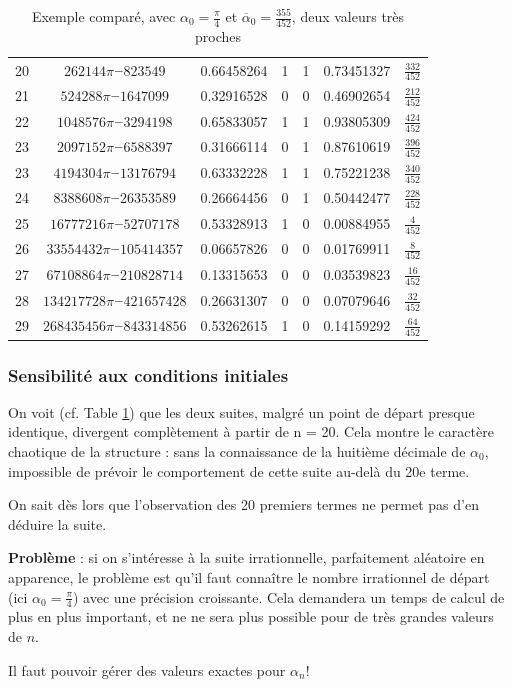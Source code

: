 \documentclass{scrartcl}
\begin{document}
\begin{table}
\begin{tabular}{|*{7}{c|}}
20 & $262144\pi‒823549$ & 0.66458264 & 1 & 1 & 0.73451327 & $\frac{332}{452}$ \\
21 & $524288\pi‒1647099$ & 0.32916528 & 0 & 0 & 0.46902654 & $\frac{212}{452}$ \\
22 & $1048576\pi‒3294198$ & 0.65833057 & 1 & 1 & 0.93805309 & $\frac{424}{452}$ \\
23 & $2097152\pi‒6588397$ & 0.31666114 & 0 & 1 & 0.87610619 & $\frac{396}{452}$ \\
23 & $4194304\pi‒13176794$ & 0.63332228 & 1 & 1 & 0.75221238 & $\frac{340}{452}$ \\
24 & $8388608\pi‒26353589$ & 0.26664456 & 0 & 1 & 0.50442477 & $\frac{228}{452}$ \\
25 & $16777216\pi‒52707178$ & 0.53328913 & 1 & 0 & 0.00884955 & $\frac{4}{452}$ \\
26 & $33554432\pi‒105414357$ & 0.06657826 & 0 & 0 & 0.01769911 & $\frac{8}{452}$ \\
27 & $67108864\pi‒210828714$ & 0.13315653 & 0 & 0 & 0.03539823 & $\frac{16}{452}$ \\
28 & $134217728\pi‒421657428$ & 0.26631307 & 0 & 0 & 0.07079646 & $\frac{32}{452}$ \\
29 & $268435456\pi‒843314856$ & 0.53262615 & 1 & 0 & 0.14159292 & $\frac{64}{452}$ \\
\end{tabular}
\caption{Exemple comparé, avec $\alpha_0 = \frac{\pi}{4}$ et
  $\overline{\alpha}_0 = \frac{355}{452}$, deux valeurs très proches
  \label{t:chaos}
}
\end{table}

\subsubsection{Sensibilité aux conditions initiales}
On voit (cf. Table \ref{t:chaos}) que les deux suites, malgré un point de départ
presque identique, divergent complètement à partir de n = 20. Cela montre le
caractère chaotique de la structure : sans la connaissance de la huitième
décimale de $\alpha_0$, impossible de prévoir le comportement de cette suite
au-delà du 20e terme.\par
On sait dès lors que l’observation des 20 premiers termes ne permet pas d’en
déduire la suite.\par
\par
\textbf{Problème} : si on s’intéresse à la suite irrationnelle, parfaitement
aléatoire en apparence, le problème est qu’il faut connaître le nombre
irrationnel de départ (ici $\alpha_0 = \frac{\pi}{4}$) avec une précision
croissante. Cela demandera un temps de calcul de plus en plus important, et ne
ne sera plus possible pour de très grandes valeurs de $n$. \par
Il faut pouvoir gérer des valeurs exactes pour $\alpha_n$!
\end{document}
